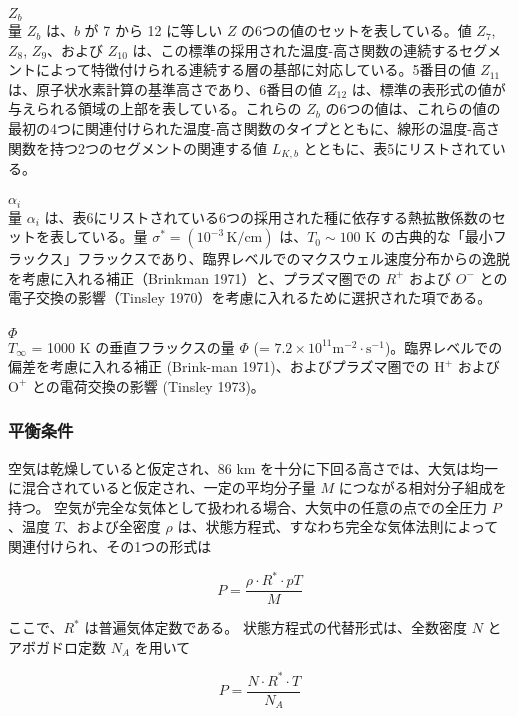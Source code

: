 \documentclass{article}
\begin{document}
\\$Z_b$\\
量 $Z_b$ は、$b$ が 7 から 12 に等しい $Z$ の6つの値のセットを表している。値 $Z_7$, $Z_8$, $Z_9$、および $Z_{10}$ は、この標準の採用された温度-高さ関数の連続するセグメントによって特徴付けられる連続する層の基部に対応している。5番目の値 $Z_{11}$ は、原子状水素計算の基準高さであり、6番目の値 $Z_{12}$ は、標準の表形式の値が与えられる領域の上部を表している。これらの $Z_b$ の6つの値は、これらの値の最初の4つに関連付けられた温度-高さ関数のタイプとともに、線形の温度-高さ関数を持つ2つのセグメントの関連する値 $L_{K,b}$ とともに、表5にリストされている。\\
\\$\alpha_i$\\
量 $\alpha_i$ は、表6にリストされている6つの採用された種に依存する熱拡散係数のセットを表している。量 $\sigma^* = (10^{-3}\, \mathrm{K/cm})$ は、$T_{0} \sim 100$ K の古典的な「最小フラックス」フラックスであり、臨界レベルでのマクスウェル速度分布からの逸脱を考慮に入れる補正（Brinkman 1971）と、プラズマ圏での $R^+$ および $O^-$ との電子交換の影響（Tinsley 1970）を考慮に入れるために選択された項である。\\
\\$\Phi$\\
$T _\infty$ = 1000 K の垂直フラックスの量 $\Phi$ (= $7.2\times 10^{11}\text{m}^{-2} \cdot \text{s}^{-1}$)。臨界レベルでの偏差を考慮に入れる補正 (Brink-man 1971)、およびプラズマ圏での $\text{H}^+$ および $\text{O}^+$ との電荷交換の影響 (Tinsley 1973)。

\subsubsection{平衡条件}
空気は乾燥していると仮定され、86 km を十分に下回る高さでは、大気は均一に混合されていると仮定され、一定の平均分子量 $M$ につながる相対分子組成を持つ。
空気が完全な気体として扱われる場合、大気中の任意の点での全圧力 $P$、温度 $T$、および全密度 $\rho$ は、状態方程式、すなわち完全な気体法則によって関連付けられ、その1つの形式は

\begin{equation}
  P = \frac{\rho \cdot R^* \cdot pT}{M} \tag{1}
\end{equation}

ここで、$R^*$ は普遍気体定数である。
状態方程式の代替形式は、全数密度 $N$ とアボガドロ定数 $N_A$ を用いて

\begin{equation}
  P = \frac{N \cdot R^* \cdot T}{N_A} \tag{2}
\end{equation}
\end{document}
